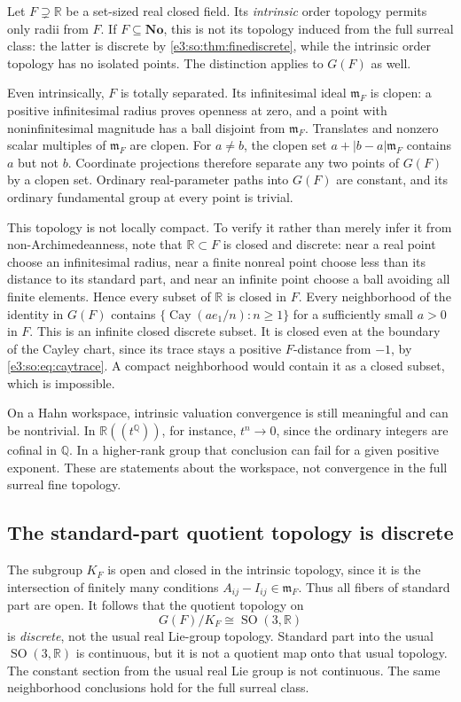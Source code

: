 \documentclass[11pt,letterpaper]{article}
\numberwithin{equation}{section}
\theoremstyle{definition}
\theoremstyle{remark}
\newcommand{\No}{\mathbf{No}}
\newcommand{\R}{\mathbb R}
\newcommand{\Q}{\mathbb Q}
\newcommand{\mm}{\mathfrak m}
\newcommand{\SO}{\operatorname{SO}}
\newcommand{\cay}{\operatorname{Cay}}
\newcommand{\abs}[1]{\left|#1\right|}
\begin{document}
Let \(F\supsetneq\R\) be a set-sized real closed field. Its \emph{intrinsic}
order topology permits only radii from \(F\). If \(F\subseteq\No\), this is
not its topology induced from the full surreal class: the latter is discrete
by \cref{e3:so:thm:finediscrete}, while the intrinsic order topology has no isolated
points. The distinction applies to \(G(F)\) as well.

Even intrinsically, \(F\) is totally separated. Its infinitesimal ideal
\(\mm_F\) is clopen: a positive infinitesimal radius proves openness at zero,
and a point with noninfinitesimal magnitude has a ball disjoint from
\(\mm_F\). Translates and nonzero scalar multiples of \(\mm_F\) are clopen.
For \(a\ne b\), the clopen set \(a+\abs{b-a}\mm_F\) contains \(a\) but not
\(b\). Coordinate projections therefore separate any two points of \(G(F)\)
by a clopen set. Ordinary real-parameter paths into \(G(F)\) are constant, and
its ordinary fundamental group at every point is trivial.

This topology is not locally compact. To verify it rather than merely infer it
from non-Archimedeanness, note that \(\R\subset F\) is closed and discrete:
near a real point choose an infinitesimal radius, near a finite nonreal point
choose less than its distance to its standard part, and near an infinite point
choose a ball avoiding all finite elements. Hence every subset of \(\R\) is
closed in \(F\). Every neighborhood of the identity in \(G(F)\) contains
\(\{\cay(ae_1/n):n\ge1\}\) for a sufficiently small \(a>0\) in \(F\).
This is an infinite closed discrete subset. It is closed even at the boundary
of the Cayley chart, since its trace stays a positive \(F\)-distance from
\(-1\), by \cref{e3:so:eq:caytrace}. A compact neighborhood would contain it as a
closed subset, which is impossible.

On a Hahn workspace, intrinsic valuation convergence is still meaningful and
can be nontrivial. In \(\R((t^\Q))\), for instance, \(t^n\to0\), since the
ordinary integers are cofinal in \(\Q\). In a higher-rank group that conclusion
can fail for a given positive exponent. These are statements about the
workspace, not convergence in the full surreal fine topology.

\subsection{The standard-part quotient topology is discrete}

The subgroup \(K_F\) is open and closed in the intrinsic topology, since it is
the intersection of finitely many conditions \(A_{ij}-I_{ij}\in\mm_F\).
Thus all fibers of standard part are open. It follows that the quotient topology
on
\begin{equation}\label{e3:so:eq:discretequotient}
 G(F)/K_F\cong\SO(3,\R)
\end{equation}
is \emph{discrete}, not the usual real Lie-group topology. Standard part into
the usual \(\SO(3,\R)\) is continuous, but it is not a quotient map onto that
usual topology. The constant section from the usual real Lie group is not
continuous. The same neighborhood conclusions hold for the full surreal class.
\end{document}
